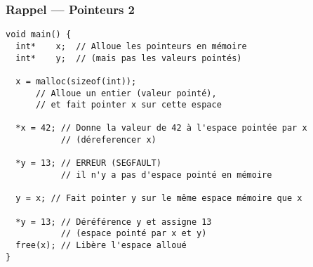 \documentclass[12pt,svgnames]{beamer}
\begin{document}
\begin{frame}[fragile=singleslide]
	\frametitle{Rappel --- Pointeurs 2}
	\begin{adjustwidth}{-0.5em}{0em}
		\begin{verbatim}
void main() {   
  int*    x;  // Alloue les pointeurs en mémoire 
  int*    y;  // (mais pas les valeurs pointés)

  x = malloc(sizeof(int));
      // Alloue un entier (valeur pointé),
      // et fait pointer x sur cette espace
    
  *x = 42; // Donne la valeur de 42 à l'espace pointée par x
           // (déreferencer x)

  *y = 13; // ERREUR (SEGFAULT)
           // il n'y a pas d'espace pointé en mémoire

  y = x; // Fait pointer y sur le même espace mémoire que x
    
  *y = 13; // Déréférence y et assigne 13
           // (espace pointé par x et y)
  free(x); // Libère l'espace alloué
}
		\end{verbatim}				
	\end{adjustwidth}
\end{frame}


\end{document}
